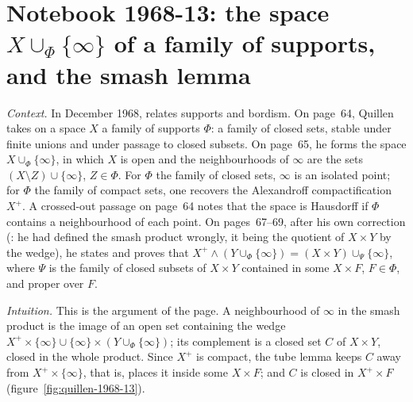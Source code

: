\section[Notebook 1968-13: the space $X \cup_\Phi \{\infty\}$ and the smash lemma]{Notebook 1968-13: the space $X \cup_\Phi \{\infty\}$ of a family of supports, and the smash lemma\protect\piste\protect{}}\label{sec:quillen-1968-13}

\emph{Context.} In December 1968,  relates supports and bordism. On page~64, Quillen takes on a space $X$ a family of supports $\Phi$: a family of closed sets, stable under finite unions and under passage to closed subsets. On page~65, he forms the space $X \cup_\Phi \{\infty\}$, in which $X$ is open and the neighbourhoods of $\infty$ are the sets $(X \setminus Z) \cup \{\infty\}$, $Z \in \Phi$. For $\Phi$ the family of closed sets, $\infty$ is an isolated point; for $\Phi$ the family of compact sets, one recovers the Alexandroff compactification $X^+$. A crossed-out passage on page~64 notes that the space is Hausdorff if $\Phi$ contains a neighbourhood of each point. On pages~67--69, after his own correction (: he had defined the smash product wrongly, it being the quotient of $X \times Y$ by the wedge), he states and proves that $X^+ \wedge (Y \cup_\Phi \{\infty\}) = (X \times Y) \cup_\Psi \{\infty\}$, where $\Psi$ is the family of closed subsets of $X \times Y$ contained in some $X \times F$, $F \in \Phi$, and proper over $F$.

\emph{Intuition.} This is the argument of the page. A neighbourhood of $\infty$ in the smash product is the image of an open set containing the wedge $X^+ \times \{\infty\} \cup \{\infty\} \times (Y \cup_\Phi \{\infty\})$; its complement is a closed set $C$ of $X \times Y$, closed in the whole product. Since $X^+$ is compact, the tube lemma keeps $C$ away from $X^+ \times \{\infty\}$, that is, places it inside some $X \times F$; and $C$ is closed in $X^+ \times F$ (figure~\ref{fig:quillen-1968-13}).


